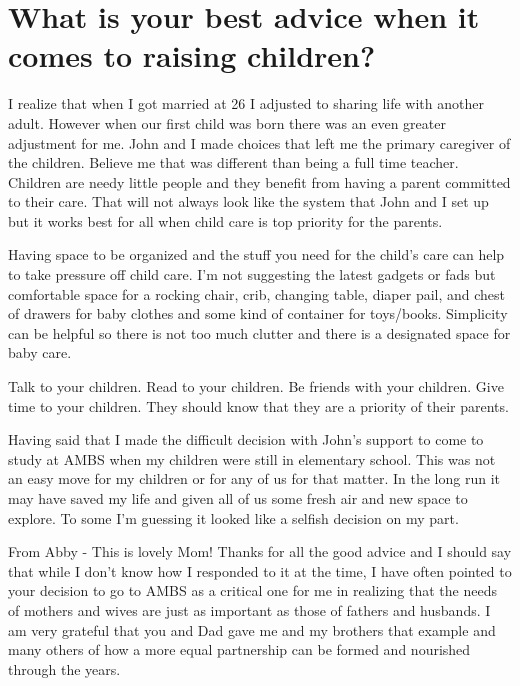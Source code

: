 \section{What is your best advice when it comes to raising children?}
I realize that when I got married at 26 I adjusted to sharing life with another adult.
However when our first child was born there was an even greater adjustment for me.
John and I made choices that left me the primary caregiver of the children.
Believe me that was different than being a full time teacher.
Children are needy little people and they benefit from having a parent committed to their care.
That will not always look like the system that John and I set up but it works best for all when child care is top priority for the parents.

Having space to be organized and the stuff you need for the child's care can help to take pressure off child care.
I'm not suggesting the latest gadgets or fads but comfortable space for a rocking chair, crib, changing table, diaper pail, and chest of drawers for baby clothes and some kind of container for toys/books.
Simplicity can be helpful so there is not too much clutter and there is a designated space for baby care.

Talk to your children.
Read to your children.
Be friends with your children.
Give time to your children.
They should know that they are a priority of their parents.

Having said that I made the difficult decision with John's support to come to study at AMBS when my children were still in elementary school.
This was not an easy move for my children or for any of us for that matter.
In the long run it may have saved my life and given all of us some fresh air and new space to explore.
To some I'm guessing it looked like a selfish decision on my part.

From Abby - This is lovely Mom! Thanks for all the good advice and I should say that while I don't know how I responded to it at the time, I have often pointed to your decision to go to AMBS as a critical one for me in realizing that the needs of mothers and wives are just as important as those of fathers and husbands.
I am very grateful that you and Dad gave me and my brothers that example and many others of how a more equal partnership can be formed and nourished through the years.





